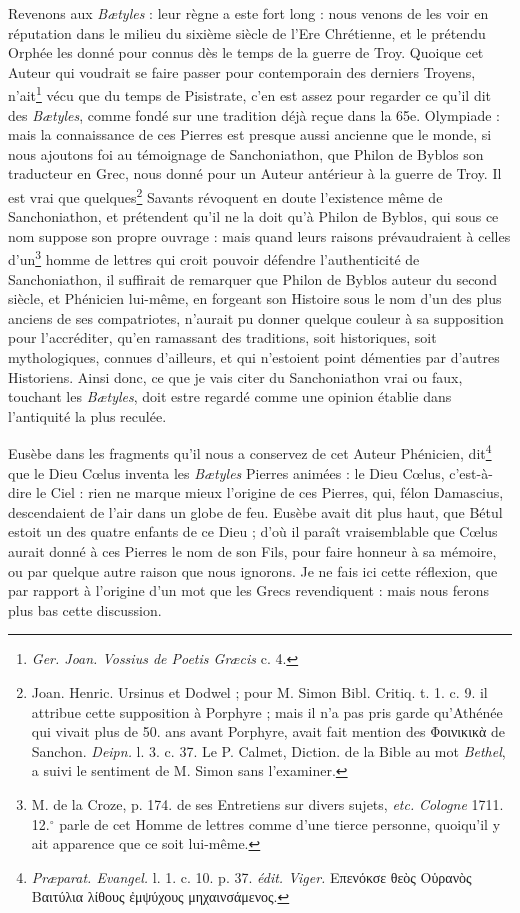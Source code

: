 \documentclass[a4paper, 11pt, oneside, polutonikogreek, french]{article}
\begin{document}
Revenons aux \emph{Bætyles} : leur règne a este fort long : nous venons de les voir en réputation dans le milieu du sixième siècle de l'Ere Chrétienne, et le prétendu Orphée les donné pour connus dès le temps de la guerre de Troy. Quoique cet Auteur qui voudrait se faire passer pour contemporain des derniers Troyens, n'ait\footnote{\emph{Ger. Joan. Vossius de Poetis Græcis} c. 4.} vécu que du temps de Pisistrate, c'en est assez pour regarder ce qu'il dit des \emph{Bætyles}, comme fondé sur une tradition déjà reçue dans la 65e. Olympiade : mais la connaissance de ces Pierres est presque aussi ancienne que le monde, si nous ajoutons foi au témoignage de Sanchoniathon, que Philon de Byblos son traducteur en Grec, nous donné pour un Auteur antérieur à la guerre de Troy. Il est vrai que quelques\footnote{Joan. Henric. Ursinus et Dodwel ; pour M. Simon Bibl. Critiq. t. 1. c. 9. il attribue cette supposition à Porphyre ; mais il n'a pas pris garde qu'Athénée qui vivait plus de 50. ans avant Porphyre, avait fait mention des Φοινικικὰ de Sanchon. \emph{Deipn.} l. 3. c. 37. Le P. Calmet, Diction. de la Bible au mot \emph{Bethel}, a suivi le sentiment de M. Simon sans l'examiner.} Savants révoquent en doute l'existence même de Sanchoniathon, et prétendent qu'il ne la doit qu'à Philon de Byblos, qui sous ce nom suppose son propre ouvrage : mais quand leurs raisons prévaudraient à celles d'un\footnote{M. de la Croze, p. 174. de ses Entretiens sur divers sujets, \emph{etc.} \emph{Cologne} 1711. 12.$^\circ$ parle de cet Homme de lettres comme d'une tierce personne, quoiqu’il y ait apparence que ce soit lui-même.} homme de lettres qui croit pouvoir défendre l'authenticité de Sanchoniathon, il suffirait de remarquer que Philon de Byblos auteur du second siècle, et Phénicien lui-même, en forgeant son Histoire sous le nom d'un des plus anciens de ses compatriotes, n'aurait pu donner quelque couleur à sa supposition pour l'accréditer, qu'en ramassant des traditions, soit historiques, soit mythologiques, connues d'ailleurs, et qui n'estoient point démenties par d'autres Historiens. Ainsi donc, ce que je vais citer du Sanchoniathon vrai ou faux, touchant les \emph{Bætyles}, doit estre regardé comme une opinion établie dans l'antiquité la plus reculée.

Eusèbe dans les fragments qu'il nous a conservez de cet Auteur Phénicien, dit\footnote{\emph{Præparat. Evangel.} l. 1. c. 10. p. 37. \emph{édit. Viger.} Επενόκσε θεὸς Οὑρανὸς Βαιτύλια λίθους ἐμψύχους μηχαινσάμενος.} que le Dieu Cœlus inventa les \emph{Bætyles} Pierres animées : le Dieu Cœlus, c'est-à-dire le Ciel : rien ne marque mieux l'origine de ces Pierres, qui, félon Damascius, descendaient de l'air dans un globe de feu. Eusèbe avait dit plus haut, que Bétul estoit un des quatre enfants de ce Dieu ; d'où il paraît vraisemblable que Cœlus aurait donné à ces Pierres le nom de son Fils, pour faire honneur à sa mémoire, ou par quelque autre raison que nous ignorons. Je ne fais ici cette réflexion, que par rapport à l'origine d'un mot que les Grecs revendiquent : mais nous ferons plus bas cette discussion.
\end{document}
